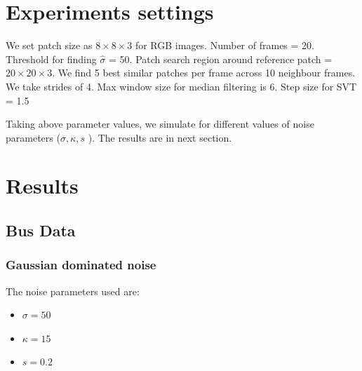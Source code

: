\documentclass{article}
\begin{document}
\section{Experiments settings}
We set patch size as $8 \times 8 \times 3$ for RGB images. Number of frames = 20. Threshold for finding $\hat{\sigma}$ = 50. Patch search region around reference patch = $20 \times 20 \times 3$. We find 5 best similar patches per frame across 10 neighbour frames. We take strides of 4. Max window size for median filtering is 6. Step size for SVT = 1.5 

Taking above parameter values, we simulate for different values of noise parameters ($\sigma , \kappa, s$ ). The results are in next section.

\newpage
\section{Results}
\subsection*{Bus Data}
\subsubsection*{Gaussian dominated noise}
The noise parameters used are: \\
\begin{itemize}
    \item $\sigma = 50$
    \item $\kappa = 15$
    \item $s = 0.2$
\end{itemize}
\end{document}
